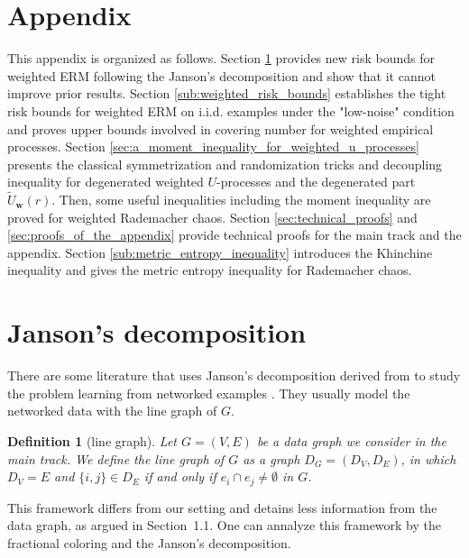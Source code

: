 \documentclass[letterpaper]{article} %
\newtheorem{definition}{Definition}
\newcommand{\weight}{\mathbf{w}}
\newcommand{\edge}[1]{\{#1\}}
\begin{document}
\section*{Appendix} %
\appendix
\label{sec:appendix}

This appendix is organized as follows. Section \ref{sec:fractional_coloring_approach} provides new risk bounds for weighted ERM following the Janson's decomposition and show that it cannot improve prior results.
Section \ref{sub:weighted_risk_bounds} establishes the tight risk bounds for weighted ERM on i.i.d. examples under the "low-noise" condition and proves upper bounds involved in covering number for weighted empirical processes. 
Section \ref{sec:a_moment_inequality_for_weighted_u_processes} presents the classical symmetrization and randomization tricks and decoupling inequality for degenerated weighted $U$-processes and the degenerated part $\widetilde{U}_\weight{}(r)$.
Then, some useful inequalities including the moment inequality are proved for weighted Rademacher chaos.
Section \ref{sec:technical_proofs} and \ref{sec:proofs_of_the_appendix} provide technical proofs for the main track and the appendix.
Section \ref{sub:metric_entropy_inequality} introduces the Khinchine inequality and gives the metric entropy inequality for Rademacher chaos.

\section{Janson's decomposition} %
\label{sec:fractional_coloring_approach}

There are some literature that uses Janson's decomposition derived from \cite{janson2004large} to study the problem learning from networked examples \cite{Usunier2005,Biau2006,ralaivola2009chromatic,DBLP:conf/icml/RalaivolaA15}.
They usually model the networked data with the line graph of $G$.
\begin{definition}[line graph]
  \label{de:line graph}
  Let $G=(V,E)$ be a data graph we consider in the main track. We define the line graph of $G$ as a graph $D_G = (D_V, D_E)$, in which $D_V = E$ and $\edge{i,j}\in D_E$ if and only if $e_i\cap e_j\neq\emptyset$ in $G$.
\end{definition}
This framework differs from our setting and detains less information from the data graph, as argued in Section~1.1. 
One can annalyze this framework by the fractional coloring and the Janson's decomposition.
\end{document}
